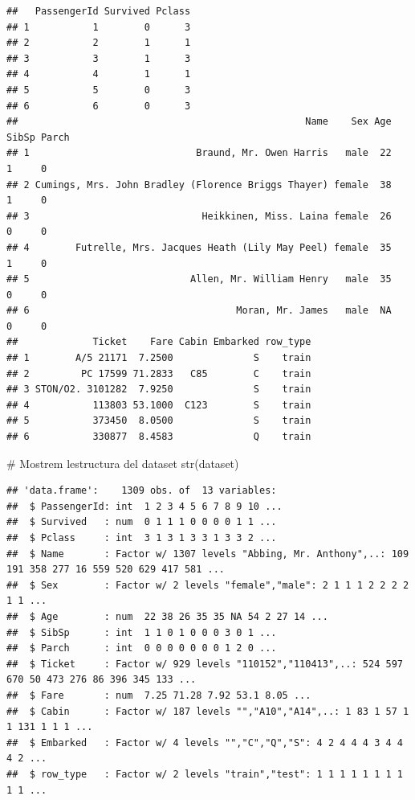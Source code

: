\documentclass[
]{article}
\newenvironment{Shaded}{\begin{snugshade}}{\end{snugshade}}
\newcommand{\CommentTok}[1]{\textcolor[rgb]{0.50,0.62,0.50}{#1}}
\newcommand{\FunctionTok}[1]{\textcolor[rgb]{0.94,0.94,0.56}{#1}}
\newcommand{\NormalTok}[1]{\textcolor[rgb]{0.80,0.80,0.80}{#1}}
\begin{document}
\begin{verbatim}
##   PassengerId Survived Pclass
## 1           1        0      3
## 2           2        1      1
## 3           3        1      3
## 4           4        1      1
## 5           5        0      3
## 6           6        0      3
##                                                  Name    Sex Age SibSp Parch
## 1                             Braund, Mr. Owen Harris   male  22     1     0
## 2 Cumings, Mrs. John Bradley (Florence Briggs Thayer) female  38     1     0
## 3                              Heikkinen, Miss. Laina female  26     0     0
## 4        Futrelle, Mrs. Jacques Heath (Lily May Peel) female  35     1     0
## 5                            Allen, Mr. William Henry   male  35     0     0
## 6                                    Moran, Mr. James   male  NA     0     0
##             Ticket    Fare Cabin Embarked row_type
## 1        A/5 21171  7.2500              S    train
## 2         PC 17599 71.2833   C85        C    train
## 3 STON/O2. 3101282  7.9250              S    train
## 4           113803 53.1000  C123        S    train
## 5           373450  8.0500              S    train
## 6           330877  8.4583              Q    train
\end{verbatim}

\begin{Shaded}
\begin{Highlighting}[]
\CommentTok{\# Mostrem l\textquotesingle{}estructura del dataset}
\FunctionTok{str}\NormalTok{(dataset)}
\end{Highlighting}
\end{Shaded}

\begin{verbatim}
## 'data.frame':    1309 obs. of  13 variables:
##  $ PassengerId: int  1 2 3 4 5 6 7 8 9 10 ...
##  $ Survived   : num  0 1 1 1 0 0 0 0 1 1 ...
##  $ Pclass     : int  3 1 3 1 3 3 1 3 3 2 ...
##  $ Name       : Factor w/ 1307 levels "Abbing, Mr. Anthony",..: 109 191 358 277 16 559 520 629 417 581 ...
##  $ Sex        : Factor w/ 2 levels "female","male": 2 1 1 1 2 2 2 2 1 1 ...
##  $ Age        : num  22 38 26 35 35 NA 54 2 27 14 ...
##  $ SibSp      : int  1 1 0 1 0 0 0 3 0 1 ...
##  $ Parch      : int  0 0 0 0 0 0 0 1 2 0 ...
##  $ Ticket     : Factor w/ 929 levels "110152","110413",..: 524 597 670 50 473 276 86 396 345 133 ...
##  $ Fare       : num  7.25 71.28 7.92 53.1 8.05 ...
##  $ Cabin      : Factor w/ 187 levels "","A10","A14",..: 1 83 1 57 1 1 131 1 1 1 ...
##  $ Embarked   : Factor w/ 4 levels "","C","Q","S": 4 2 4 4 4 3 4 4 4 2 ...
##  $ row_type   : Factor w/ 2 levels "train","test": 1 1 1 1 1 1 1 1 1 1 ...
\end{verbatim}
\end{document}
